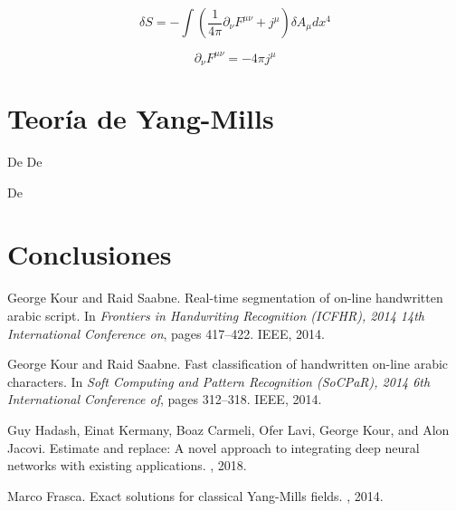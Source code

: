 \documentclass{article}
\begin{document}
$${\delta S=-\int\left(\frac{1}{4 \pi} \partial_{\nu} F^{\mu \nu}+j^{\mu}\right) \delta A_{\mu} dx^{4}}$$

$$\partial_{\nu} F^{\mu \nu}=-4 \pi j^{\mu}
$$

\section{Teoría de Yang-Mills}

De \cite{frasca2014exact}De \cite{frasca2014exact}

De \cite{frasca2014exact}



\section{Conclusiones}
\label{sec:out}

\begin{thebibliography}{1}

George Kour and Raid Saabne.
\newblock Real-time segmentation of on-line handwritten arabic script.
\newblock In {\em Frontiers in Handwriting Recognition (ICFHR), 2014 14th
  International Conference on}, pages 417--422. IEEE, 2014.

George Kour and Raid Saabne.
\newblock Fast classification of handwritten on-line arabic characters.
\newblock In {\em Soft Computing and Pattern Recognition (SoCPaR), 2014 6th
  International Conference of}, pages 312--318. IEEE, 2014.

Guy Hadash, Einat Kermany, Boaz Carmeli, Ofer Lavi, George Kour, and Alon
  Jacovi.
\newblock Estimate and replace: A novel approach to integrating deep neural
  networks with existing applications.
, 2018.

Marco Frasca.
\newblock Exact solutions for classical Yang-Mills fields.
, 2014.

\end{thebibliography}
\end{document}
